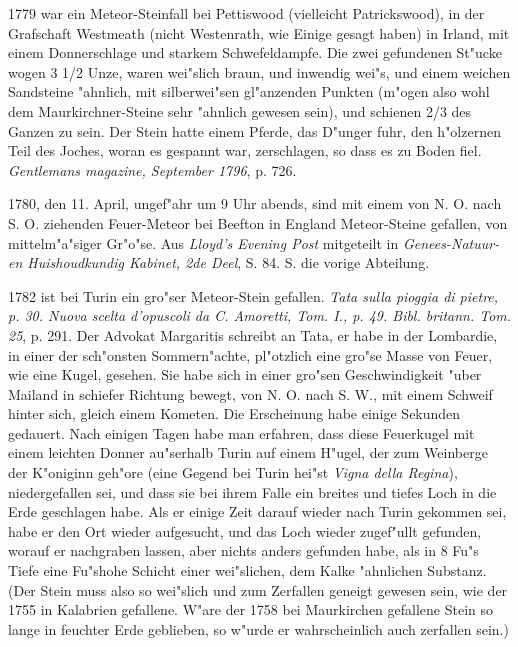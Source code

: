 \documentclass[a4paper, 11pt, oneside, polutonikogreek, german]{article}
\begin{document}
1779 war ein Meteor-Steinfall bei Pettiswood (vielleicht Patrickswood), in der Grafschaft Westmeath (nicht Westenrath, wie Einige gesagt haben) in Irland, mit einem Donnerschlage und starkem Schwefeldampfe. Die zwei gefundenen St"ucke wogen 3 1/2 Unze, waren wei"slich braun, und inwendig wei"s, und einem weichen Sandsteine "ahnlich, mit silberwei"sen gl"anzenden Punkten (m"ogen also wohl dem Maurkirchner-Steine sehr "ahnlich gewesen sein), und schienen 2/3 des Ganzen zu sein. Der Stein hatte einem Pferde, das D"unger fuhr, den h"olzernen Teil des Joches, woran es gespannt war, zerschlagen, so dass es zu Boden fiel. \emph{Gentlemans magazine, September 1796}, p. 726.

1780, den 11. April, ungef"ahr um 9 Uhr abends, sind mit einem von N. O. nach S. O. ziehenden Feuer-Meteor bei Beefton in England Meteor-Steine gefallen, von mittelm"a"siger Gr"o"se. Aus \emph{Lloyd's Evening Post} mitgeteilt in \emph{Genees-Natuur-en Huishoudkundig Kabinet, 2de Deel}, S. 84. S. die vorige Abteilung.

1782 ist bei Turin ein gro"ser Meteor-Stein gefallen. \emph{Tata sulla pioggia di pietre, p. 30. Nuova scelta d'opuscoli da C. Amoretti, Tom. I., p. 49. Bibl. britann. Tom. 25}, p. 291. Der Advokat Margaritis schreibt an Tata, er habe in der Lombardie, in einer der sch"onsten Sommern"achte, pl"otzlich eine gro"se Masse von Feuer, wie eine Kugel, gesehen. Sie habe sich in einer gro"sen Geschwindigkeit "uber Mailand in schiefer Richtung bewegt, von N. O. nach S. W., mit einem Schweif hinter sich, gleich einem Kometen. Die Erscheinung habe einige Sekunden gedauert. Nach einigen Tagen habe man erfahren, dass diese Feuerkugel mit einem leichten Donner au"serhalb Turin auf einem H"ugel, der zum Weinberge der K"oniginn geh"ore (eine Gegend bei Turin hei"st \emph{Vigna della Regina}), niedergefallen sei, und dass sie bei ihrem Falle ein breites und tiefes Loch in die Erde geschlagen habe. Als er einige Zeit darauf wieder nach Turin gekommen sei, habe er den Ort wieder aufgesucht, und das Loch wieder zugef"ullt gefunden, worauf er nachgraben lassen, aber nichts anders gefunden habe, als in 8 Fu"s Tiefe eine Fu"shohe Schicht einer wei"slichen, dem Kalke "ahnlichen Substanz. (Der Stein muss also so wei"slich und zum Zerfallen geneigt gewesen sein, wie der 1755 in Kalabrien gefallene. W"are der 1758 bei Maurkirchen gefallene Stein so lange in feuchter Erde geblieben, so w"urde er wahrscheinlich auch zerfallen sein.)
\end{document}
